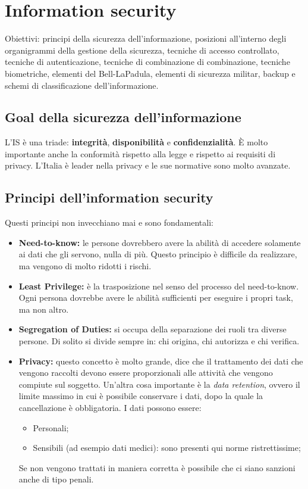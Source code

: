 \chapter{Information security}

Obiettivi: principi della sicurezza dell'informazione, posizioni all'interno 
degli organigrammi della gestione della sicurezza, tecniche di accesso 
controllato, tecniche di autenticazione, tecniche di combinazione di combinazione, 
tecniche biometriche, elementi del Bell-LaPadula, elementi di sicurezza militar, 
backup e schemi di classificazione dell'informazione.


\section{Goal della sicurezza dell'informazione}

L'IS è una triade: \textbf{integrità}, \textbf{disponibilità} e 
\textbf{confidenzialità}. È molto importante anche la conformità rispetto alla 
legge e rispetto ai requisiti di privacy. L'Italia è leader nella privacy e le 
sue normative sono molto avanzate.


\section{Principi dell'information security}

Questi principi non invecchiano mai e sono fondamentali:
\begin{itemize}
  \item \textbf{Need-to-know:} le persone dovrebbero avere la abilità di accedere solamente ai dati che gli
  servono, nulla di più. Questo principio è difficile da realizzare, ma vengono
  di molto ridotti i rischi.
  \item \textbf{Least Privilege:} è la trasposizione nel senso del processo del need-to-know. Ogni persona
  dovrebbe avere le abilità sufficienti per eseguire i propri task, ma non
  altro.
  \item \textbf{Segregation of Duties:} si occupa della separazione dei ruoli tra diverse persone. Di solito si
  divide sempre in: chi origina, chi autorizza e chi verifica.
  \item \textbf{Privacy:} questo concetto è molto grande, dice che il trattamento dei dati che
  vengono raccolti devono essere proporzionali alle attività che vengono
  compiute sul soggetto. Un'altra cosa importante è la \textit{data retention},
  ovvero il limite massimo in cui è possibile conservare i dati, dopo la quale
  la cancellazione è obbligatoria. I dati possono essere:
  \begin{itemize}
    \item Personali;
    \item Sensibili (ad esempio dati medici): sono presenti qui norme
    ristrettissime;
  \end{itemize}
  Se non vengono trattati in maniera corretta è possibile che ci siano sanzioni
  anche di tipo penali.
\end{itemize}

